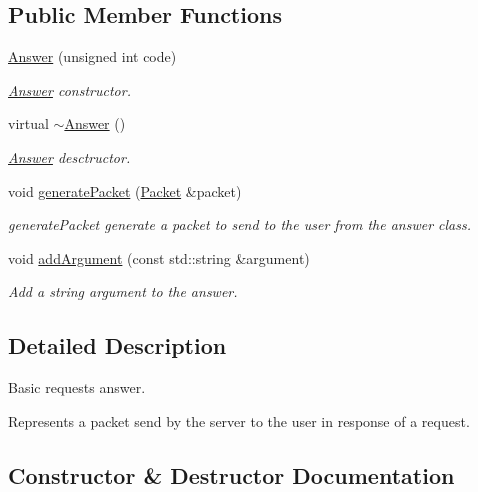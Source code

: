 \subsection*{Public Member Functions}
\begin{DoxyCompactItemize}
\item 
\hyperlink{classFTP_1_1Answer_a39151234c908f7e3028ee74d6290e8bf}{Answer} (unsigned int code)
\begin{DoxyCompactList}\small\item\em \hyperlink{classFTP_1_1Answer}{Answer} constructor. \end{DoxyCompactList}\item 
\hypertarget{classFTP_1_1Answer_abbba9b114d548fab7419060548b5f1e8}{}virtual \hyperlink{classFTP_1_1Answer_abbba9b114d548fab7419060548b5f1e8}{$\sim$\+Answer} ()\label{classFTP_1_1Answer_abbba9b114d548fab7419060548b5f1e8}

\begin{DoxyCompactList}\small\item\em \hyperlink{classFTP_1_1Answer}{Answer} desctructor. \end{DoxyCompactList}\item 
void \hyperlink{classFTP_1_1Answer_ac7d2718a9c3b31b620403d34dad8b55e}{generate\+Packet} (\hyperlink{classFTP_1_1Packet}{Packet} \&packet)
\begin{DoxyCompactList}\small\item\em generate\+Packet generate a packet to send to the user from the answer class. \end{DoxyCompactList}\item 
void \hyperlink{classFTP_1_1Answer_acd97d40fea4bb26e0e18429000d9705f}{add\+Argument} (const std\+::string \&argument)
\begin{DoxyCompactList}\small\item\em Add a string argument to the answer. \end{DoxyCompactList}\end{DoxyCompactItemize}


\subsection{Detailed Description}
Basic request\textquotesingle{}s answer. 

Represents a packet send by the server to the user in response of a request. 

\subsection{Constructor \& Destructor Documentation}
\hypertarget{classFTP_1_1Answer_a39151234c908f7e3028ee74d6290e8bf}{}
